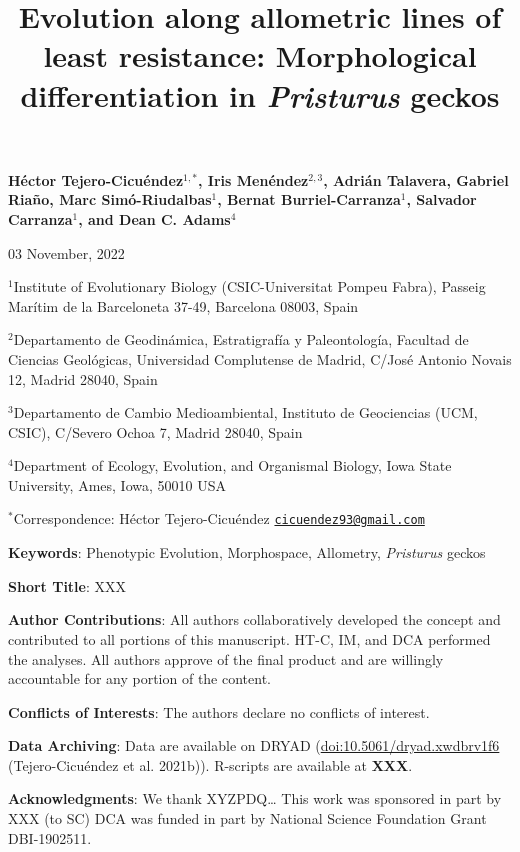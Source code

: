 \documentclass[
  11pt,
]{article}
\title{Evolution along allometric lines of least resistance:
Morphological differentiation in \emph{Pristurus} geckos}
\author{}
\date{\vspace{-2.5em}}
\begin{document}
\maketitle

\begin{center}
\textbf{H{\'{e}}ctor Tejero-Cicu{\'{e}}ndez$^{1,*}$,  Iris Men{\'{e}}ndez$^{2,3}$, Adri{\'{a}}n Talavera, Gabriel Riaño, Marc Sim{\'{o}}-Riudalbas$^{1}$, Bernat Burriel-Carranza$^{1}$, Salvador Carranza$^{1}$, and Dean C. Adams$^{4}$}
\end{center}

\begin{center}03 November, 2022\end{center}

\(^{1}\)Institute of Evolutionary Biology (CSIC-Universitat Pompeu
Fabra), Passeig Marítim de la Barceloneta 37-49, Barcelona 08003, Spain

\(^{2}\)Departamento de Geodinámica, Estratigrafía y Paleontología,
Facultad de Ciencias Geológicas, Universidad Complutense de Madrid,
C/José Antonio Novais 12, Madrid 28040, Spain

\(^{3}\)Departamento de Cambio Medioambiental, Instituto de Geociencias
(UCM, CSIC), C/Severo Ochoa 7, Madrid 28040, Spain

\(^{4}\)Department of Ecology, Evolution, and Organismal Biology, Iowa
State University, Ames, Iowa, 50010 USA

\(^{*}\)Correspondence: Héctor Tejero-Cicuéndez
\href{mailto:cicuendez93@gmail.com}{\nolinkurl{cicuendez93@gmail.com}}

\hfill\break

\textbf{Keywords}: Phenotypic Evolution, Morphospace, Allometry,
\emph{Pristurus} geckos \hfill\break

\textbf{Short Title}: XXX \hfill\break

\textbf{Author Contributions}: All authors collaboratively developed the
concept and contributed to all portions of this manuscript. HT-C, IM,
and DCA performed the analyses. All authors approve of the final product
and are willingly accountable for any portion of the
content.\hfill\break

\textbf{Conflicts of Interests}: The authors declare no conflicts of
interest.\hfill\break

\textbf{Data Archiving}: Data are available on DRYAD
(\url{doi:10.5061/dryad.xwdbrv1f6} (Tejero-Cicuéndez et al. 2021b)).
R-scripts are available at \textbf{XXX}. \hfill\break

\textbf{Acknowledgments}: We thank XYZPDQ\ldots{} This work was
sponsored in part by XXX (to SC) DCA was funded in part by National
Science Foundation Grant DBI-1902511.
\end{document}
